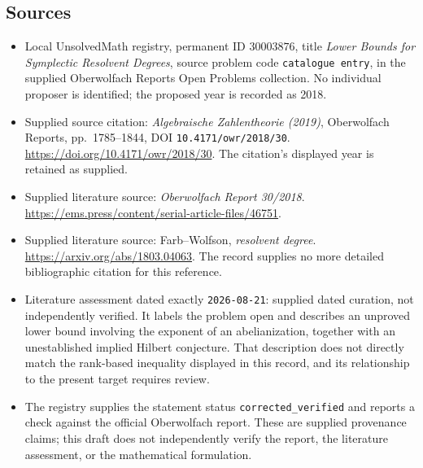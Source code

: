 \documentclass[11pt]{article}
\begin{document}
\subsection{Sources}
\begin{itemize}
\item Local UnsolvedMath registry, permanent ID \(30003876\), title \emph{Lower Bounds for Symplectic Resolvent Degrees}, source problem code \texttt{catalogue entry}, in the supplied Oberwolfach Reports Open Problems collection. No individual proposer is identified; the proposed year is recorded as 2018.
\item Supplied source citation: \emph{Algebraische Zahlentheorie (2019)}, Oberwolfach Reports, pp.\ 1785--1844, DOI \texttt{10.4171/owr/2018/30}. \url{https://doi.org/10.4171/owr/2018/30}. The citation's displayed year is retained as supplied.
\item Supplied literature source: \emph{Oberwolfach Report 30/2018}. \url{https://ems.press/content/serial-article-files/46751}.
\item Supplied literature source: Farb--Wolfson, \emph{resolvent degree}. \url{https://arxiv.org/abs/1803.04063}. The record supplies no more detailed bibliographic citation for this reference.
\item Literature assessment dated exactly \texttt{2026-08-21}: supplied dated curation, not independently verified. It labels the problem open and describes an unproved lower bound involving the exponent of an abelianization, together with an unestablished implied Hilbert conjecture. That description does not directly match the rank-based inequality displayed in this record, and its relationship to the present target requires review.
\item The registry supplies the statement status \texttt{corrected\_verified} and reports a check against the official Oberwolfach report. These are supplied provenance claims; this draft does not independently verify the report, the literature assessment, or the mathematical formulation.
\end{itemize}
\end{document}
